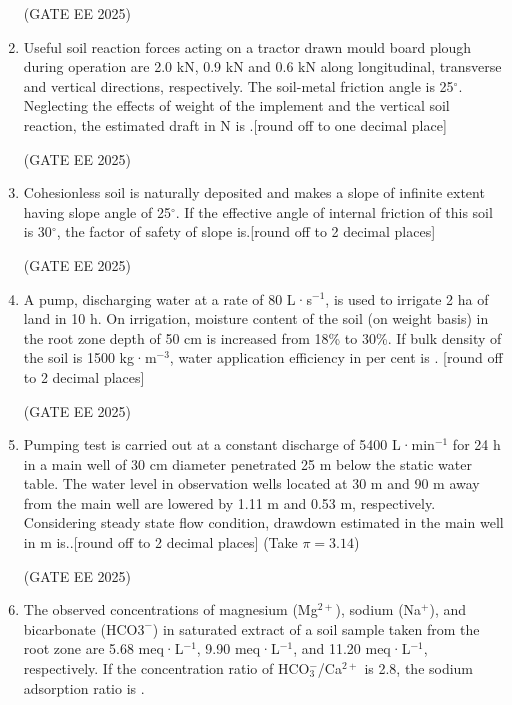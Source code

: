 \documentclass[journal,12pt,onecolumn]{IEEEtran}
\theoremstyle{remark}
\begin{document}
\begin{enumerate}
\hfill(GATE EE 2025)

\item Useful soil reaction forces acting on a tractor drawn mould board plough during operation are 2.0 kN, 0.9 kN and 0.6 kN along longitudinal, transverse and vertical directions, respectively. The soil-metal friction angle is 25$^\circ$. Neglecting the effects of weight of the implement and the vertical soil reaction, the estimated draft in N is \underline{\hspace{2cm}}.{[round off to one decimal place]}

\hfill(GATE EE 2025)

\item Cohesionless soil is naturally deposited and makes a slope of infinite extent having slope angle of 25$^\circ$. If the effective angle of internal friction of this soil is 30$^\circ$, the factor of safety of slope is\underline{\hspace{2cm}}.{[round off to 2 decimal places]}

\hfill(GATE EE 2025)

\item A pump, discharging water at a rate of 80 L·s$^{-1}$, is used to irrigate 2 ha of land in 10 h. On irrigation, moisture content of the soil (on weight basis) in the root zone depth of 50 cm is increased from 18\% to 30\%. If bulk density of the soil is 1500 kg·m$^{-3}$, water application efficiency in per cent is \underline{\hspace{2cm}}. {[round off to 2 decimal places]}

\hfill(GATE EE 2025)

\item Pumping test is carried out at a constant discharge of 5400 L·min$^{-1}$ for 24 h in a main well of 30 cm diameter penetrated 25 m below the static water table. The water level in observation wells located at 30 m and 90 m away from the main well are lowered by 1.11 m and 0.53 m, respectively. Considering steady state flow condition, drawdown estimated in the main well in m is.\underline{\hspace{2cm}}.{[round off to 2 decimal places] (Take $\pi = 3.14$)}

\hfill(GATE EE 2025)

\item The observed concentrations of magnesium (Mg$^{2+}$), sodium (Na$^{+}$), and bicarbonate (HCO$3^-$) in saturated extract of a soil sample taken from the root zone are 5.68 meq·L$^{-1}$, 9.90 meq·L$^{-1}$, and 11.20 meq·L$^{-1}$, respectively. If the concentration ratio of HCO$_3^-$/Ca$^{2+}$ is 2.8, the sodium adsorption ratio is \underline{\hspace{2cm}} .  


\end{enumerate}
\end{document}
